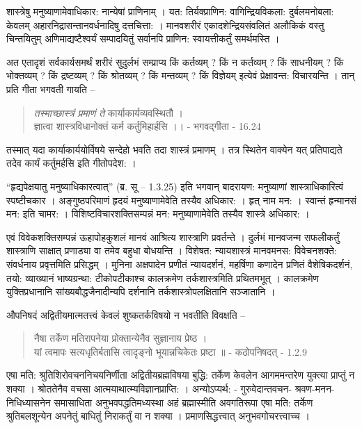 {शास्त्रेषु मनुष्याणामेवाधिकार: नान्येषां प्राणिनाम् । यत: तिर्यक्प्राणिन: वागिन्द्रियविकला: दुर्बलमनोबला: केवलम् अहारनिद्रासन्तानवर्धनादिषु दत्तचित्ता: । मानवशरीरं एकादशेन्द्रियसंवलितं अलौकिकं वस्तु चिन्तयितुम् अणिमाद्यष्टैश्वर्यं सम्पादयितुं सर्वानपि प्राणिन: स्वायत्तीकर्तुं समर्थमस्ति ।

अत एतादृशं सर्वकार्यसमर्थं शरीरं सुदुर्लभं सम्प्राप्य किं कर्तव्यम् ? किं न कर्तव्यम् ? किं साधनीयम् ? किं भोक्तव्यम् ? किं द्रष्टव्यम् ? किं श्रोतव्यम् ? किं मन्तव्यम् ? किं विज्ञेयम् इत्येवं प्रेक्षावन्त: विचारयन्ति । तान् प्रति गीता भगवती गायति –
\begin{verse}
\textit{तस्माच्छास्त्रं प्रमाणं ते} कार्याकार्यव्यवस्थितौ ।\\
ज्ञात्वा शास्त्रविधानोक्तं कर्म कर्तुमिहार्हसि ।। - भगवद्गीता - 16.24
\end{verse}
तस्मात् यदा कार्याकार्ययोर्विषये सन्देहो भवति तदा शास्त्रं प्रमाणम् । तत्र स्थितेन वाक्येन यत् प्रतिपाद्यते तदेव कार्यं कर्तुमर्हसि इति गीतोपदेश: ।

“हृद्यपेक्षयातु मनुष्याधिकारत्वात्” (ब्र. सू – 1.3.25) इति भगवान् बादरायण: मनुष्याणां शास्त्राधिकारित्वं स्पष्टीचकार । अङ्गुष्ठपरिमाणं हृदयं मनुष्याणामेवेति तस्यैव अधिकार: । हृत् नाम मन: । स्वान्तं हृन्मानसं मन: इति चामर: । विशिष्टविचारशक्तिसम्पन्नं मन: मनुष्याणामेवेति तस्यैव शास्त्रे अधिकार: ।

एवं विवेकशक्तिसम्पन्नं ऊहापोहकुशलं मानवं आश्रित्य शास्त्राणि प्रवर्तन्ते । दुर्लभं मानवजन्म सफलीकर्तुं शास्त्राणि साक्षात् प्रणाड्या वा तमेव बहुधा बोधयन्ति । विशेषत: न्यायशास्त्रं मानवमनस: विवेचनशक्ते: संवर्धनाय प्रवृत्तमिति प्रसिद्धम् । मुनिना अक्षपादेन प्रणीतं न्यायदर्शनं, महर्षिणा कणादेन प्रणितं वैशेषिकदर्शनं, तयो: व्याख्यानं भाष्यग्रन्था: टीकोपटीकाश्च कालक्रमेण तर्कशास्त्रमिति प्रथितमभूत् । कालक्रमेण युक्तिप्रधानानि सांख्यबौद्धजैनादीन्यपि दर्शनानि तर्कशास्त्रोपलक्षितानि सञ्जातानि ।

औपनिषदं अद्वितीयमात्मतत्त्वं केवलं शुष्कतर्कविषयो न भवतीति विवक्षति –
\begin{verse}
नैषा तर्केण मतिरापनेया प्रोक्तान्येनैव सुज्ञानाय प्रेष्ठ ।\\
यां त्वमापः सत्यधृतिर्बतासि त्वादृङ्नो भूयान्नचिकेतः प्रष्टा ॥ - कठोपनिषदत् - 1.2.9
\end{verse}
एषा मति: श्रुतिशिरोवचननिचयनिर्णीता अद्वितीयब्रह्मविषया बुद्धि: तर्केण केवलेन आगममन्तरेण युक्त्या प्राप्तुं न शक्या । श्रोततेनैव वचसा आत्मयाथात्म्यविज्ञानप्राप्ति: । अन्योऽप्यर्थ: - गुरुवेदान्तवचन- श्रवण-मनन-निधिध्यासनेन समासाधिता अनुभवपद्धतिमध्यस्था अहं ब्रह्मास्मीति अवगतिरूपा एषा मति: तर्केण श्रुतिबलशून्येन अपनेतुं बाधितुं निराकर्तुं वा न शक्या । प्रमाणसिद्धत्त्वात् अनुभवगोचरत्त्वाच्च ।

}
